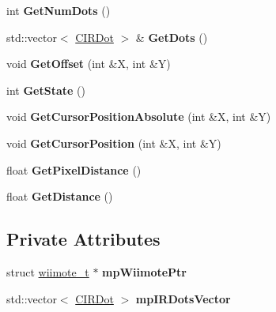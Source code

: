 \begin{DoxyCompactItemize}
\item 
\hypertarget{class_c_i_r_a76afd635873b098e0cd6c8b9bcab9587}{int {\bfseries \-Get\-Num\-Dots} ()}\label{class_c_i_r_a76afd635873b098e0cd6c8b9bcab9587}

\item 
\hypertarget{class_c_i_r_a696847a5468daceba452bbd152f0e853}{std\-::vector$<$ \hyperlink{class_c_i_r_dot}{\-C\-I\-R\-Dot} $>$ \& {\bfseries \-Get\-Dots} ()}\label{class_c_i_r_a696847a5468daceba452bbd152f0e853}

\item 
\hypertarget{class_c_i_r_aeb23613d64e95e7e7fff717c83f68377}{void {\bfseries \-Get\-Offset} (int \&\-X, int \&\-Y)}\label{class_c_i_r_aeb23613d64e95e7e7fff717c83f68377}

\item 
\hypertarget{class_c_i_r_aee4bc6e44ee5903b2c45cc46bf5be361}{int {\bfseries \-Get\-State} ()}\label{class_c_i_r_aee4bc6e44ee5903b2c45cc46bf5be361}

\item 
\hypertarget{class_c_i_r_a573324907a9082fe70d65b419ed83a5e}{void {\bfseries \-Get\-Cursor\-Position\-Absolute} (int \&\-X, int \&\-Y)}\label{class_c_i_r_a573324907a9082fe70d65b419ed83a5e}

\item 
\hypertarget{class_c_i_r_a8b37d7fa74319ff3736cf39956f82df0}{void {\bfseries \-Get\-Cursor\-Position} (int \&\-X, int \&\-Y)}\label{class_c_i_r_a8b37d7fa74319ff3736cf39956f82df0}

\item 
\hypertarget{class_c_i_r_a254b766dbc50c29d5d08ae8375e764f8}{float {\bfseries \-Get\-Pixel\-Distance} ()}\label{class_c_i_r_a254b766dbc50c29d5d08ae8375e764f8}

\item 
\hypertarget{class_c_i_r_aa9d59cb470867a28b558f310b154fcc2}{float {\bfseries \-Get\-Distance} ()}\label{class_c_i_r_aa9d59cb470867a28b558f310b154fcc2}

\end{DoxyCompactItemize}
\subsection*{\-Private \-Attributes}
\begin{DoxyCompactItemize}
\item 
\hypertarget{class_c_i_r_aa1a05a67ac59456976f1f5ad6b894137}{struct \hyperlink{structwiimote__t}{wiimote\-\_\-t} $\ast$ {\bfseries mp\-Wiimote\-Ptr}}\label{class_c_i_r_aa1a05a67ac59456976f1f5ad6b894137}

\item 
\hypertarget{class_c_i_r_a3edb622c7e2bd20852c0fe6bb0e427e5}{std\-::vector$<$ \hyperlink{class_c_i_r_dot}{\-C\-I\-R\-Dot} $>$ {\bfseries mp\-I\-R\-Dots\-Vector}}\label{class_c_i_r_a3edb622c7e2bd20852c0fe6bb0e427e5}

\end{DoxyCompactItemize}


